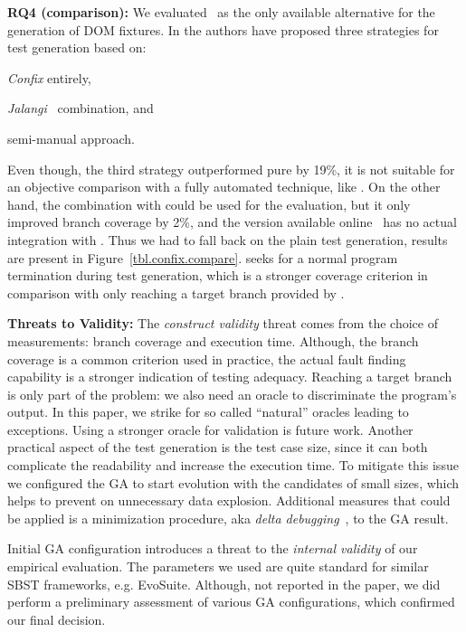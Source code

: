 \textbf{RQ4 (comparison):} We evaluated \Confix\ as the only available alternative for the generation of DOM fixtures. In \cite{amin:ase15} the authors have proposed three strategies for test generation based on:
\begin{enumerate*}[label=(\roman*)]
  \item \emph{Confix} entirely,
  \item \emph{Jalangi}~\cite{sen2013jalangi} combination, and
  \item semi-manual approach.
\end{enumerate*}
Even though, the third strategy outperformed pure \Confix by 19\%, it is not suitable for an objective comparison with a fully automated technique, like \Jedi. On the other hand, the combination with \Jalangi could be used for the evaluation, but it only improved branch coverage by 2\%, and the \Confix version available online~\cite{confixgit} has no actual integration with \Jalangi. Thus we had to fall back on the plain \Confix test generation, results are present in Figure~\ref{tbl.confix.compare}. \Jedi seeks for a normal program termination during test generation, which is a stronger coverage criterion in comparison with only reaching a target branch provided by \Confix.\\

\textbf{Threats to Validity:}
The \emph{construct validity} threat comes from the choice of measurements: branch coverage and execution time. Although, the branch coverage is a common criterion used in practice, the actual fault finding capability is a stronger indication of testing adequacy. Reaching a target branch is only part of the problem: we also need an oracle to discriminate the program's output. In this paper, we strike for so called ``natural'' oracles leading to exceptions. Using a stronger oracle for validation is future work. Another practical aspect of the test generation is the test case size, since it can both complicate the readability and increase the execution time. To mitigate this issue we configured the GA to start evolution with the candidates of small sizes, which helps to prevent on unnecessary data explosion. Additional measures that could be applied is a minimization procedure, aka \emph{delta debugging}~\cite{misherghi2006hdd}, to the GA result.

Initial GA configuration introduces a threat to the \emph{internal validity} of our empirical evaluation. The parameters we used are quite standard for similar SBST frameworks, e.g. EvoSuite. Although, not reported in the paper, we did perform a preliminary assessment of various GA configurations, which confirmed our final decision.

